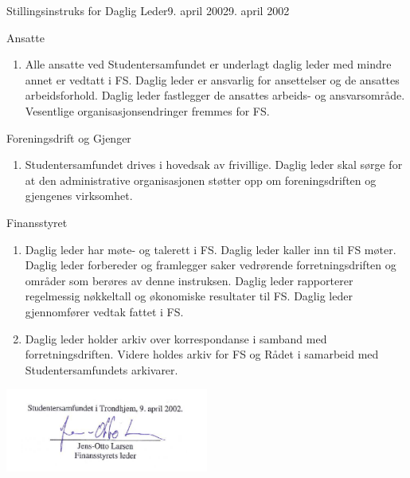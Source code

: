 \begin{instruks}{Stillingsinstruks for Daglig Leder}{9. april 2002}{9. april 2002}
    \begin{instruksledd}{Ansatte}
        \begin{enumerate}
            \item Alle ansatte ved Studentersamfundet er underlagt daglig leder med mindre annet er vedtatt 
                i FS. Daglig leder er ansvarlig for
                ansettelser og de ansattes arbeidsforhold. Daglig leder fastlegger de ansattes arbeids- og ansvarsområde. Vesentlige
                organisasjonsendringer fremmes for FS.
        \end{enumerate}
    \end{instruksledd}
\pagebreak
    \begin{instruksledd}{Foreningsdrift og Gjenger}
        \begin{enumerate}
            \item Studentersamfundet drives i hovedsak av frivillige. Daglig leder skal sørge for at den administrative organisasjonen
                støtter opp om foreningsdriften og gjengenes virksomhet.
        \end{enumerate}
    \end{instruksledd}

    \begin{instruksledd}{Finansstyret}
        \begin{enumerate}
            \item Daglig leder har møte- og talerett i FS. Daglig leder kaller inn til FS møter. Daglig leder 
                forbereder og framlegger saker vedrørende
                forretningsdriften og områder som berøres av denne instruksen. Daglig leder rapporterer regelmessig nøkkeltall og
                økonomiske resultater til FS. Daglig leder gjennomfører vedtak fattet i FS.
            \item Daglig leder holder arkiv over korrespondanse i samband med forretningsdriften. Videre holdes arkiv for FS og Rådet
                i samarbeid med Studentersamfundets arkivarer.
        \end{enumerate}
    \end{instruksledd}

    \begin{center}
    	\includegraphics[width=0.5\textwidth]{DagligLeder-sign}
    \end{center}

\end{instruks}


